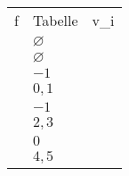 \vspace{\baselineskip}

\noindent
\begin{tabular}{L | P{1.2cm}  L}
	\hline
	f \quad\quad\quad\quad& Tabelle&v_i\\
	&$\varnothing$ &\\
	&$\varnothing$ &\\
	&$-1$ &\\
	&$0,1$ &\\
	&$-1$ &\\
	&$2,3$ &\\
	&$0$ &\\
	&$4,5$ &\\
\end{tabular}

